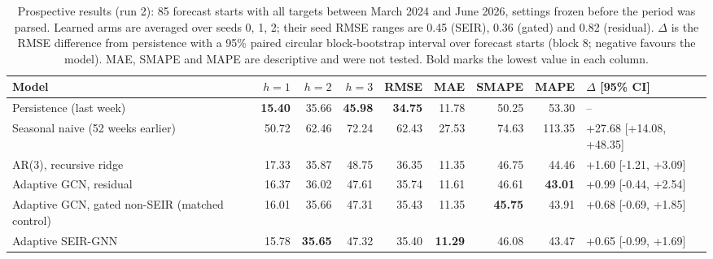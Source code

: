 \begin{table}[t]
\centering
\caption{Prospective results (run 2): 85 forecast starts with all targets between March 2024 and June 2026, settings frozen before the period was parsed. Learned arms are averaged over seeds 0, 1, 2; their seed RMSE ranges are 0.45 (SEIR), 0.36 (gated) and 0.82 (residual). $\Delta$ is the RMSE difference from persistence with a 95\% paired circular block-bootstrap interval over forecast starts (block 8; negative favours the model). MAE, SMAPE and MAPE are descriptive and were not tested. Bold marks the lowest value in each column.}
\label{tab:prospective}
\small\setlength{\tabcolsep}{3.5pt}
\begin{tabular}{@{}lrrrrrrrl@{}}
\toprule
Model & $h=1$ & $h=2$ & $h=3$ & RMSE & MAE & SMAPE & MAPE & $\Delta$ [95\% CI] \\
\midrule
Persistence (last week) & \textbf{15.40} & 35.66 & \textbf{45.98} & \textbf{34.75} & 11.78 & 50.25 & 53.30 & -- \\ %
Seasonal naive (52 weeks earlier) & 50.72 & 62.46 & 72.24 & 62.43 & 27.53 & 74.63 & 113.35 & +27.68 [+14.08, +48.35] \\ %
AR(3), recursive ridge & 17.33 & 35.87 & 48.75 & 36.35 & 11.35 & 46.75 & 44.46 & +1.60 [-1.21, +3.09] \\ %
Adaptive GCN, residual & 16.37 & 36.02 & 47.61 & 35.74 & 11.61 & 46.61 & \textbf{43.01} & +0.99 [-0.44, +2.54] \\ %
Adaptive GCN, gated non-SEIR (matched control) & 16.01 & 35.66 & 47.31 & 35.43 & 11.35 & \textbf{45.75} & 43.91 & +0.68 [-0.69, +1.85] \\ %
Adaptive SEIR-GNN & 15.78 & \textbf{35.65} & 47.32 & 35.40 & \textbf{11.29} & 46.08 & 43.47 & +0.65 [-0.99, +1.69] \\ %
\bottomrule
\end{tabular}
\end{table}
